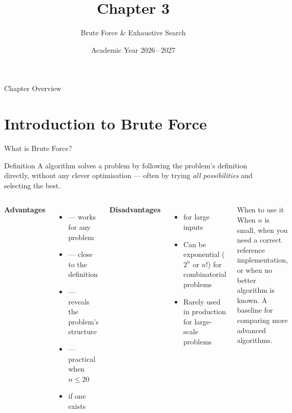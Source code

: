 \documentclass[aspectratio=169]{beamer}
\title[Ch.\,3 -- Brute Force]{Chapter 3}
\subtitle{Brute Force \& Exhaustive Search}
\date{Academic Year 2026\,--\,2027}
\begin{document}
\begin{frame}[plain]\titlepage\end{frame}
\begin{frame}{Chapter Overview}
  \begin{center}
    \begin{minipage}{0.85\textwidth}
      \tableofcontents[hideallsubsections,sectionstyle=show/shaded]
    \end{minipage}
  \end{center}
\end{frame}

\section{Introduction to Brute Force}

\begin{frame}[shrink=16]{What is Brute Force?}
  \begin{block}{Definition}
    A  algorithm solves a problem by following the
    problem's definition directly, without any clever optimisation — often
    by trying \emph{all possibilities} and selecting the best.
  \end{block}
  \begin{columns}[T]
      \textbf{Advantages}
      \begin{itemize}
        \item {} — works for any problem
        \item {} — close to the definition
        \item {} — reveals the problem's structure
        \item {} — practical when $n \leq 20$
        \item {} if one exists
      \end{itemize}
      \textbf{Disadvantages}
      \begin{itemize}
        \item {} for large inputs
        \item Can be exponential ($2^n$ or $n!$) for combinatorial problems
        \item Rarely used in production for large-scale problems
      \end{itemize}
      \begin{exampleblock}{When to use it}
        When $n$ is small, when you need a correct reference
        implementation, or when no better algorithm is known. A baseline for comparing more advanced algorithms.
      \end{exampleblock}
  \end{columns}
\end{frame}
\end{document}
